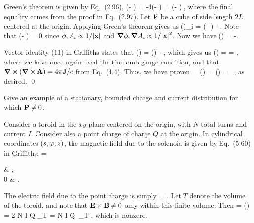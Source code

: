 \begin{solution}
	Green's theorem is given by Eq.~(2.96),
	\beq
		\intS \nh \cdot (\phiq \grad\phiw - \phiw \grad\phiq) \dS = -4\pi \intcV(\phiq \rhow - \phiw \rhoq) \dcx
		= \intcV (\phiq \lap\phiw - \phiw \lap\phiq) \dcx,
	\eeq
	where the final equality comes from the proof in Eq.~(2.97).  Let $\mathcal{V}$ be a cube of side length $2L$ centered at the origin.  Applying Green's theorem gives us
	\beq
		\intcV (\vE \times \vB)_i \dcx = \intS \nh \cdot (\phi \grad\Ai - \Ai \grad\phi) \dS - \intcV \phi \lap\Ai \dcx.
	\eeq
	Note that
	\beq
		\limLi \intS \nh \cdot (\phi \grad\Ai - \Ai \grad\phi) \dS \propto \limLi \intS {} \dS = 0
	\eeq
	since $\phi, A_i \propto 1/\abs{\vb{x}}$ and $\grad\phi, \grad A_i \propto 1/\abs{\vb{x}}^2$.  Now we have
	\beq
		\int (\vE \times \vB) \dcx = -\int \phi \lap\vA \dcx.
	\eeq
	
	Vector identity (11) in Griffiths states that
	\beq
		\grad \times (\grad \times \vaa) = \grad (\grad \cdot \vaa) - \lap\vaa,
	\eeq
	which gives us
	\beq
		\int (\vE \times \vB) \dcx = \int \phi [\grad \times (\grad \times \vA) - \grad (\grad \cdot \vA)] \dcx
		=  \int \phi \vJ \dcx,
	\eeq
	where we have once again used the Coulomb gauge condition, and that $\grad \times (\grad \times \vb{A}) = 4\pi \vb{J} / c$ from Eq.~(4.4).  Thus, we have proven
	\beq
		\vP = \int \cP(\vx) \dcx =  \int (\vE \times \vB) \dcx = \int \phix \, \vJx \dcx,
	\eeq
	as desired. \qed
	
\end{solution}


\clearpage
\begin{problem}
	Give an example of a stationary, bounded charge and current distribution for which $\vb{P} \neq 0$.
\end{problem}

\begin{solution}
	Consider a toroid in the $xy$ plane centered on the origin, with $N$ total turns and current $I$.  Consider also a point charge of charge $Q$ at the origin.  In cylindrical coordinates $(s, \varphi, z)$, the magnetic field due to the solenoid is given by Eq.~(5.60) in Griffiths:
	\beq
		\vBx = \begin{cases}
			 \phh & , \\[2ex]
			0 & .
		\end{cases}
	\eeq
	The electric field due to the point charge is simply
	\beq
		\vE =  \rh.
	\eeq
	Let $T$ denote the volume of the toroid, and note that $\vb{E} \times \vb{B} \neq 0$ only within this finite volume.  Then
	\beq
		\vP =  \int (\vE \times \vB) \dcx
		=  2 N I Q \int_T  \dcx
		=  N I Q \,\zh \int_T ,
	\eeq
	which is nonzero.
\end{solution}